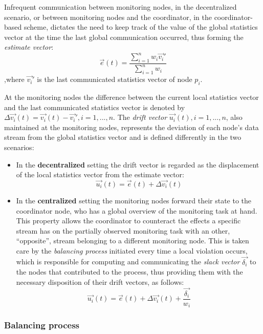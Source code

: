 Infrequent communication between monitoring nodes, in the decentralized scenario, or between monitoring nodes and the coordinator, in the coordinator-based scheme, dictates the need to keep track of the value of the global statistics vector at the time the last global communication occurred, thus forming the \emph{estimate vector}:
\begin{equation}
\vec{e}(t)=\frac{\sum_{i=1}^n {w_i \vec{v_i}'}}{\sum_{i=1}^n {w_i}}
\label{form:estimateVector}
\end{equation}
,where $\vec{v_i}'$ is the last communicated statistics vector of node $p_i$.

At the monitoring nodes the difference between the current local statistics vector and the last communicated statistics vector is denoted by $\Delta \vec{v_i}(t)=\vec{v_i}(t)-\vec{v_i}', i=1,...,n$. The \emph{drift vector} $\vec{u_i}(t), i=1,...,n$, also maintained at the monitoring nodes, represents the deviation of each node's data stream from the global statistics vector and is defined differently in the two scenarios:
\begin{itemize}
\item In the \textbf{decentralized} setting the drift vector is regarded as the displacement of the local statistics vector from the estimate vector:
\begin{equation}
\vec{u_i}(t)=\vec{e}(t)+\Delta \vec{v_i}(t)
\label{form:decentralizedDrift}
\end{equation}
\item In the \textbf{centralized} setting the monitoring nodes forward their state to the coordinator node, who has a global overview of the monitoring task at hand. This property allows the coordinator to counteract the effects a specific stream has on the partially observed monitoring task with an other, ``opposite'', stream belonging to a different monitoring node. This is taken care by the \emph{balancing process} initiated every time a local violation occurs, which is responsible for computing and communicating the \emph{slack vector} $\vec{\delta_i}$ to the nodes that contributed to the process, thus providing them with the necessary disposition of their drift vectors, as follows:
\begin{equation}
\vec{u_i}(t)=\vec{e}(t)+\Delta \vec{v_i}(t)+\frac{\vec{\delta_i}}{w_i}
\label{form:centralizedDrift}
\end{equation} 
\end{itemize}

\subsubsection{Balancing process} \label{subsubsec:theorBack-GM-balancingProc}


